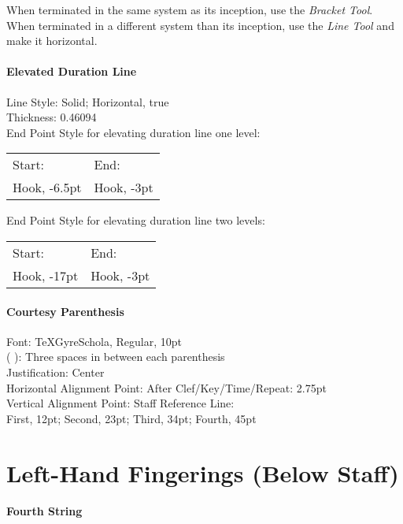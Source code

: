 \documentclass[unicode,hyperfootnotes=false,xetex,colorlinks=true,nofonts,nobib]{tufte-book} %
\begin{document}
When terminated in the same system as its inception, use the \emph{Bracket Tool}.\\
When terminated in a different system than its inception, use the \emph{Line Tool} and make it horizontal.

\paragraph{Elevated Duration Line}
\label{sec:elev-durat-line}

Line Style: Solid; Horizontal, true\\
Thickness: 0.46094\\
End Point Style for elevating duration line one level:\\
\begin{tabular}{l l}
  Start: & End:\\
  Hook, -6.5pt & Hook, -3pt\\
\end{tabular}

\noindent End Point Style for elevating duration line two levels:\\
\begin{tabular}{l l}
  Start: & End:\\
  Hook, -17pt & Hook, -3pt\\
\end{tabular}

\paragraph{Courtesy Parenthesis}
\label{sec:courtesy-parenthesis}

Font: TeXGyreSchola, Regular, 10pt\\
(   ): Three spaces in between each parenthesis\\
Justification: Center\\
Horizontal Alignment Point: After Clef/Key/Time/Repeat: 2.75pt\\
Vertical Alignment Point: Staff Reference Line:\\
\indent First, 12pt; Second, 23pt; Third, 34pt; Fourth, 45pt

\section{Left-Hand Fingerings (Below Staff)}
\label{sec:left-hand-fingerings}

\paragraph{Fourth String}
\label{sec:fourth-string}
\end{document}
